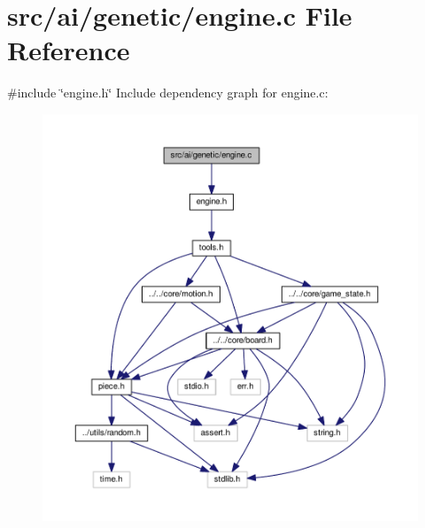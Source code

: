 \section{src/ai/genetic/engine.c File Reference}
\label{engine_8c}
{\ttfamily \#include \char`\"{}engine.\+h\char`\"{}}\newline
Include dependency graph for engine.\+c\+:
\nopagebreak
\begin{figure}[H]
\begin{center}
\leavevmode
\includegraphics[width=350pt]{engine_8c__incl}
\end{center}
\end{figure}
